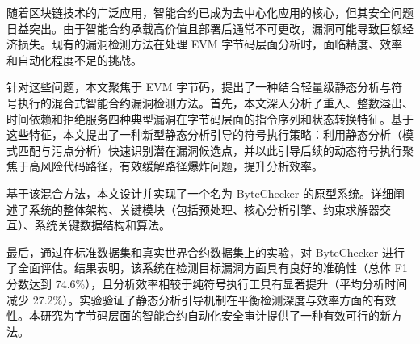 \documentclass[print, master, vlined, timesmath]{DissertUESTC}
\begin{document}


{}
{}
{}
{}
{}
{} 

 \DegLv{}  %




 {}
 {}
 {}
 {}{}
 {}


\zhabstract
随着区块链技术的广泛应用，智能合约已成为去中心化应用的核心，但其安全问题日益突出。由于智能合约承载高价值且部署后通常不可更改，漏洞可能导致巨额经济损失。现有的漏洞检测方法在处理 EVM 字节码层面分析时，面临精度、效率和自动化程度不足的挑战。

针对这些问题，本文聚焦于 EVM 字节码，提出了一种结合轻量级静态分析与符号执行的混合式智能合约漏洞检测方法。首先，本文深入分析了重入、整数溢出、时间依赖和拒绝服务四种典型漏洞在字节码层面的指令序列和状态转换特征。基于这些特征，本文提出了一种新型静态分析引导的符号执行策略：利用静态分析（模式匹配与污点分析）快速识别潜在漏洞候选点，并以此引导后续的动态符号执行聚焦于高风险代码路径，有效缓解路径爆炸问题，提升分析效率。

基于该混合方法，本文设计并实现了一个名为 ByteChecker 的原型系统。详细阐述了系统的整体架构、关键模块（包括预处理、核心分析引擎、约束求解器交互）、系统关键数据结构和算法。

最后，通过在标准数据集和真实世界合约数据集上的实验，对 ByteChecker 进行了全面评估。结果表明，该系统在检测目标漏洞方面具有良好的准确性（总体 F1 分数达到 74.6\%），且分析效率相较于纯符号执行工具有显著提升（平均分析时间减少 27.2\%）。实验验证了静态分析引导机制在平衡检测深度与效率方面的有效性。本研究为字节码层面的智能合约自动化安全审计提供了一种有效可行的新方法。
\end{document}
